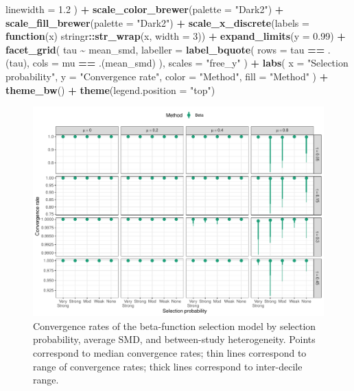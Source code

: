\documentclass[
]{article}
\newenvironment{Shaded}{\begin{snugshade}}{\end{snugshade}}
\newcommand{\AttributeTok}[1]{\textcolor[rgb]{0.13,0.29,0.53}{#1}}
\newcommand{\ControlFlowTok}[1]{\textcolor[rgb]{0.13,0.29,0.53}{\textbf{#1}}}
\newcommand{\DecValTok}[1]{\textcolor[rgb]{0.00,0.00,0.81}{#1}}
\newcommand{\FloatTok}[1]{\textcolor[rgb]{0.00,0.00,0.81}{#1}}
\newcommand{\FunctionTok}[1]{\textcolor[rgb]{0.13,0.29,0.53}{\textbf{#1}}}
\newcommand{\NormalTok}[1]{#1}
\newcommand{\SpecialCharTok}[1]{\textcolor[rgb]{0.81,0.36,0.00}{\textbf{#1}}}
\newcommand{\StringTok}[1]{\textcolor[rgb]{0.31,0.60,0.02}{#1}}
\begin{document}
\begin{Shaded}
\begin{Highlighting}[]
    \AttributeTok{linewidth =} \FloatTok{1.2}
\NormalTok{  ) }\SpecialCharTok{+} 
  \FunctionTok{scale\_color\_brewer}\NormalTok{(}\AttributeTok{palette =} \StringTok{"Dark2"}\NormalTok{) }\SpecialCharTok{+}
  \FunctionTok{scale\_fill\_brewer}\NormalTok{(}\AttributeTok{palette =} \StringTok{"Dark2"}\NormalTok{) }\SpecialCharTok{+}
  \FunctionTok{scale\_x\_discrete}\NormalTok{(}\AttributeTok{labels =} \ControlFlowTok{function}\NormalTok{(x) stringr}\SpecialCharTok{::}\FunctionTok{str\_wrap}\NormalTok{(x, }\AttributeTok{width =} \DecValTok{3}\NormalTok{)) }\SpecialCharTok{+}
  \FunctionTok{expand\_limits}\NormalTok{(}\AttributeTok{y =} \FloatTok{0.99}\NormalTok{) }\SpecialCharTok{+} 
  \FunctionTok{facet\_grid}\NormalTok{(}
\NormalTok{    tau }\SpecialCharTok{\textasciitilde{}}\NormalTok{ mean\_smd, }
    \AttributeTok{labeller =} \FunctionTok{label\_bquote}\NormalTok{(}
      \AttributeTok{rows =}\NormalTok{ tau }\SpecialCharTok{==}\NormalTok{ .(tau),}
      \AttributeTok{cols =}\NormalTok{ mu }\SpecialCharTok{==}\NormalTok{ .(mean\_smd)}
\NormalTok{    ),}
    \AttributeTok{scales =} \StringTok{"free\_y"}
\NormalTok{  ) }\SpecialCharTok{+}
  \FunctionTok{labs}\NormalTok{(}
    \AttributeTok{x =} \StringTok{"Selection probability"}\NormalTok{, }
    \AttributeTok{y =} \StringTok{"Convergence rate"}\NormalTok{, }
    \AttributeTok{color =} \StringTok{"Method"}\NormalTok{,}
    \AttributeTok{fill =} \StringTok{"Method"}
\NormalTok{  ) }\SpecialCharTok{+} 
  \FunctionTok{theme\_bw}\NormalTok{() }\SpecialCharTok{+}
  \FunctionTok{theme}\NormalTok{(}\AttributeTok{legend.position =} \StringTok{"top"}\NormalTok{)}
\end{Highlighting}
\end{Shaded}

\begin{figure}
\includegraphics{appendix-simulation-results_files/figure-latex/convergence-rates-main-1} \caption{Convergence rates of the beta-function selection model by selection probability, average SMD, and between-study heterogeneity. Points correspond to median convergence rates; thin lines correspond to range of convergence rates; thick lines correspond to inter-decile range.}\label{fig:convergence-rates-main}
\end{figure}
\end{document}
